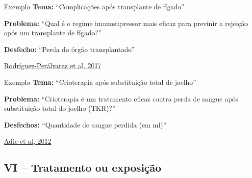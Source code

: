 \documentclass{beamer}
\begin{document}
\begin{frame}
  \begin{exampleblock}{Exemplo}
    \tiny
    {\bf Tema: }``Complicações após transplante de fígado''

    \bigskip

    {\bf Problema:} ``Qual é o regime imunosupressor mais eficaz para previnir a rejeição após um transplante de fígado?''

    \bigskip
    \normalsize
    {\bf Desfecho:} ``Perda do órgão transplantado''
  \end{exampleblock}

  \vfill
  \scriptsize
  \hfill \href{https://doi.org/10.1002/14651858.cd011639.pub2}{Rodríguez‐Perálvarez et al, 2017}
\end{frame}

\begin{frame}
  \begin{exampleblock}{Exemplo}
    \tiny
    {\bf Tema: }``Crioterapia após substituição total de joelho''

    \bigskip

    {\bf Problema:} ``Crioterapia é um tratamento eficaz contra perda de sangue após substituição total do joelho (TKR)?''

    \bigskip
    \normalsize
    {\bf Desfechos:} ``Quantidade de sangue perdida (em ml)''
  \end{exampleblock}

  \vfill
  \scriptsize
  \hfill \href{https://doi.org/10.1002/14651858.CD007911.pub2}{Adie et al, 2012}
\end{frame}

\subsection{VI -- Tratamento ou exposição}
\end{document}
